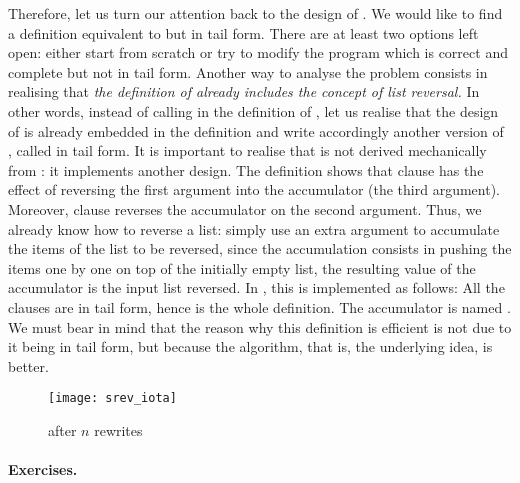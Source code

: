Therefore, let us turn our attention back to the design of
. We would like to find a definition equivalent to
 but in tail form. There are at least two options left
open: either start from scratch or try to modify the program which is
correct and complete but not in tail form. Another way to analyse the
problem consists in realising that \emph{the definition of
   already includes the concept of list reversal.}
In other words, instead of calling  in the definition
of , let us realise that the design of
 is already embedded in the definition
 and write accordingly another version of
, called  in tail form. It is important
to realise that  is not derived mechanically from
: it implements another design. The definition
 shows that clause \clause{\delta} has the
effect of reversing the first argument into the accumulator (the third
argument). Moreover, clause \clause{\gamma} reverses the accumulator
on the second argument. Thus, we already know how to reverse a list:
simply use an extra argument to accumulate the items of the list to be
reversed, since the accumulation consists in pushing the items one by
one on top of the initially empty list, the resulting value of the
accumulator is the input list reversed. In \Erlang, this is
implemented as follows:\label{code:rev_join}\label{code:rev}
 All the clauses are in tail form, hence is the
whole definition. The accumulator is named . We must bear
in mind that the reason why this definition is efficient is not due to
it being in tail form, but because the algorithm, that is, the underlying
idea, is better.
\begin{figure}[t]
\centering
\texttt{[image: srev\_iota]}%
\caption{ after \(n\)
  rewrites\label{fig:srev_iota}}
\end{figure}

\medskip

\medskip

\paragraph{Exercises.}
\label{ex:joining_and_reversing}


